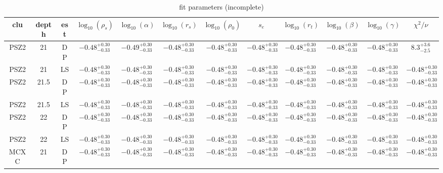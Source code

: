 \documentclass[a4paper,fleqn,usenatbib]{mnras}
\begin{document}
\begin{table}
    \centering
    \caption{fit parameters (incomplete)}
    \label{tab:fit_parameters}
    \begin{tabular}{|c|c|c|c|c|c|c|c|c|c|c|c|}
    \hline 
    clu & depth & est & $\log_{10}(\rho_s)$ & $\log_{10}(\alpha)$ & $\log_{10}(r_s)$ & $\log_{10}(\rho_0)$ & $s_e$ & $\log_{10}(r_t)$ & $\log_{10}(\beta)$ & $\log_{10}(\gamma)$ & $\chi^2/\nu$ \\ 
    \hline 
    \hline
  PSZ2 & 21 & DP & $-0.48^{+0.30}_{-0.33}$ & $-0.49^{+0.30}_{-0.33}$ & $-0.48^{+0.30}_{-0.33}$ & $-0.48^{+0.30}_{-0.33}$ & $-0.48^{+0.30}_{-0.33}$ & $-0.48^{+0.30}_{-0.33}$ & $-0.48^{+0.30}_{-0.33}$ & $-0.48^{+0.30}_{-0.33}$ & $8.3^{+3.6}_{-2.5}$ \\ 
    \hline 
  PSZ2 & 21 & LS & $-0.48^{+0.30}_{-0.33}$ & $-0.48^{+0.30}_{-0.33}$ & $-0.48^{+0.30}_{-0.33}$ & $-0.48^{+0.30}_{-0.33}$ & $-0.48^{+0.30}_{-0.33}$ & $-0.48^{+0.30}_{-0.33}$ & $-0.48^{+0.30}_{-0.33}$ & $-0.48^{+0.30}_{-0.33}$ & $-0.48^{+0.30}_{-0.33}$ \\ 
    \hline 
   PSZ2 & 21.5 & DP & $-0.48^{+0.30}_{-0.33}$ & $-0.48^{+0.30}_{-0.33}$ & $-0.48^{+0.30}_{-0.33}$ & $-0.48^{+0.30}_{-0.33}$ & $-0.48^{+0.30}_{-0.33}$ & $-0.48^{+0.30}_{-0.33}$ & $-0.48^{+0.30}_{-0.33}$ & $-0.48^{+0.30}_{-0.33}$ & $-0.48^{+0.30}_{-0.33}$ \\
    \hline
   PSZ2 & 21.5 & LS & $-0.48^{+0.30}_{-0.33}$ & $-0.48^{+0.30}_{-0.33}$ & $-0.48^{+0.30}_{-0.33}$ & $-0.48^{+0.30}_{-0.33}$ & $-0.48^{+0.30}_{-0.33}$ & $-0.48^{+0.30}_{-0.33}$ & $-0.48^{+0.30}_{-0.33}$ & $-0.48^{+0.30}_{-0.33}$ & $-0.48^{+0.30}_{-0.33}$ \\
    \hline
   PSZ2 & 22 & DP & $-0.48^{+0.30}_{-0.33}$ & $-0.48^{+0.30}_{-0.33}$ & $-0.48^{+0.30}_{-0.33}$ & $-0.48^{+0.30}_{-0.33}$ & $-0.48^{+0.30}_{-0.33}$ & $-0.48^{+0.30}_{-0.33}$ & $-0.48^{+0.30}_{-0.33}$ & $-0.48^{+0.30}_{-0.33}$ & $-0.48^{+0.30}_{-0.33}$ \\
    \hline
   PSZ2 & 22 & LS & $-0.48^{+0.30}_{-0.33}$ & $-0.48^{+0.30}_{-0.33}$ & $-0.48^{+0.30}_{-0.33}$ & $-0.48^{+0.30}_{-0.33}$ & $-0.48^{+0.30}_{-0.33}$ & $-0.48^{+0.30}_{-0.33}$ & $-0.48^{+0.30}_{-0.33}$ & $-0.48^{+0.30}_{-0.33}$ & $-0.48^{+0.30}_{-0.33}$ \\
    \hline
   MCXC & 21 & DP & $-0.48^{+0.30}_{-0.33}$ & $-0.48^{+0.30}_{-0.33}$ & $-0.48^{+0.30}_{-0.33}$ & $-0.48^{+0.30}_{-0.33}$ & $-0.48^{+0.30}_{-0.33}$ & $-0.48^{+0.30}_{-0.33}$ & $-0.48^{+0.30}_{-0.33}$ & $-0.48^{+0.30}_{-0.33}$ & $-0.48^{+0.30}_{-0.33}$ \\

\end{tabular}
\end{table}
\end{document}
